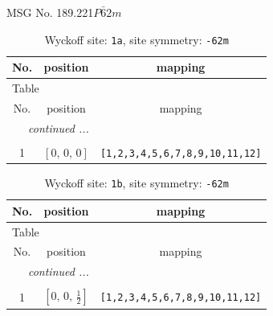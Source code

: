 \documentclass[fleqn,8pt]{jsarticle}
\begin{document}
\setcounter{MaxMatrixCols}{32}

\renewcommand{\tablename}{Table~}
\renewcommand{\figurename}{Figure~}
\begin{center}
\LARGE
MSG No. 189.221\quad$P\bar{6}2m$
\end{center}
\renewcommand{\arraystretch}{1.2}
\begin{longtable}{ccc}
\caption{Wyckoff site: {\tt 1a}, site symmetry: {\tt -62m}}
 \\
 \hline \hline
No. & position & mapping \\ \hline \endfirsthead

\multicolumn{2}{l}{\tablename\ \thetable{}} \\
 \hline \hline
No. & position & mapping \\ \hline \endhead

 \hline \hline
\multicolumn{2}{r}{\footnotesize\it continued ...} \\ \endfoot

 \hline \hline
\multicolumn{2}{r}{} \\ \endlastfoot

1 & $\left[ 0,\, 0,\, 0 \right]$ & {\tt [1,2,3,4,5,6,7,8,9,10,11,12]} \\
\end{longtable}
\renewcommand{\arraystretch}{1.2}
\begin{longtable}{ccc}
\caption{Wyckoff site: {\tt 1b}, site symmetry: {\tt -62m}}
 \\
 \hline \hline
No. & position & mapping \\ \hline \endfirsthead

\multicolumn{2}{l}{\tablename\ \thetable{}} \\
 \hline \hline
No. & position & mapping \\ \hline \endhead

 \hline \hline
\multicolumn{2}{r}{\footnotesize\it continued ...} \\ \endfoot

 \hline \hline
\multicolumn{2}{r}{} \\ \endlastfoot

1 & $\left[ 0,\, 0,\, \frac{1}{2} \right]$ & {\tt [1,2,3,4,5,6,7,8,9,10,11,12]} \\
\end{longtable}
\renewcommand{\arraystretch}{1.2}
\end{document}
